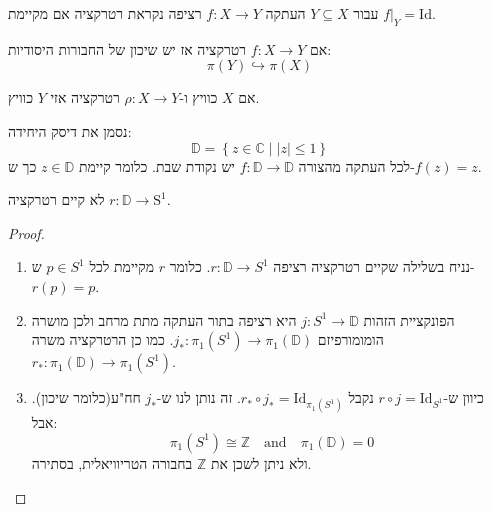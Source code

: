 \documentclass{tstextbook}
\begin{document}
\begin{definition}[רטרקציה]
עבור \(Y\subseteq X\) העתקה \(f:X\to Y\) רציפה נקראת רטרקציה אם מקיימת \(f|_{Y}=\mathrm{Id}\). 

\end{definition}
\begin{proposition}
אם \(f:X\to Y\) רטרקציה אז יש שיכון של החבורות היסודיות:
$$\pi(Y)\hookrightarrow  \pi(X)$$

\end{proposition}
\begin{proposition}
אם \(X\) כוויץ ו-\(\rho:X\to Y\) רטרקציה אזי \(Y\) כוויץ.

\end{proposition}
\begin{theorem}
נסמן את דיסק היחידה:
$$\mathbb{D} = \left\{  z \in \mathbb{C} \mid \lvert z \rvert \leq 1 \right\}$$
לכל העתקה מהצורה \(f:\mathbb{D}\to \mathbb{D}\) יש נקודת שבת. כלומר קיימת \(z \in \mathbb{D}\) כך ש-\(f(z)=z\).

\end{theorem}
\begin{lemma}
לא קיים רטרקציה \(r:\mathbb{D}\to \mathrm{S^{1}}\).

\end{lemma}
\begin{proof}
  \begin{enumerate}
    \item נניח בשלילה שקיים רטרקציה רציפה \(r:\mathbb{D}\to S^{1}\). כלומר \(r\) מקיימת לכל \(p \in S^{1}\) ש-\(r(p)=p\). 


    \item הפונקציית הזהות \(j:S^{1}\to \mathbb{D}\) היא רציפה בתור העתקה מתת מרחב ולכן מושרה הומומורפיזם \(j_{*}:\pi_{1}(S^{1})\to \pi_{1}\left( \mathbb{D} \right)\). כמו כן הרטרקציה משרה \(r_{*}:\pi_{1}\left( \mathbb{D} \right)\to\pi_{1}(S^{1})\). 


    \item כיוון ש-\(r\circ j = \mathrm{Id}_{S^{1}}\) נקבל \(r_{*}\circ j_{*}=\mathrm{Id}_{\pi_{1}(S^{1})}\). זה נותן לנו ש-\(j_{*}\) חח"ע(כלומר שיכון). אבל: 
$$\pi_{1}(S^{1})\cong\mathbb{Z}\quad{\mathrm{and}}\quad\pi_{1}({{{\mathbb{D}}}})=0$$
ולא ניתן לשכן את \(\mathbb{Z}\) בחבורה הטריוויאלית, בסתירה.


  \end{enumerate}
\end{proof}
\end{document}
